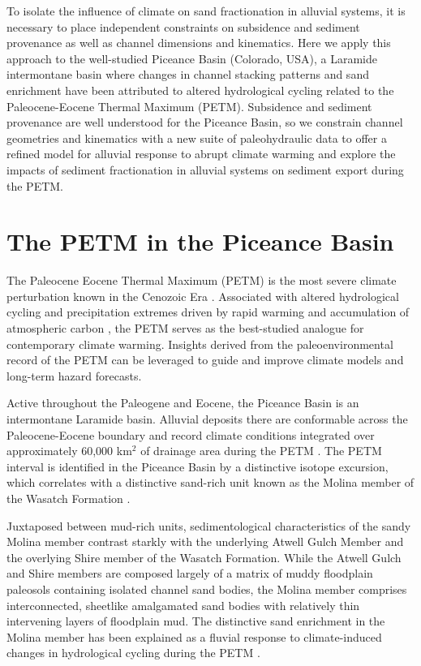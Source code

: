 \documentclass[draft]{compact_proposal}\usepackage[]{graphicx}\usepackage[]{color}
\newcommand{\del}[3]{\ce{\delta^#1#2_{#3}}}
\begin{document}
To isolate the influence of climate on sand fractionation in alluvial systems, it is necessary to place independent constraints on subsidence and sediment provenance as well as channel dimensions and kinematics.
Here we apply this approach to the well-studied Piceance Basin (Colorado, USA), a Laramide intermontane basin where changes in channel stacking patterns and sand enrichment have been attributed to altered hydrological cycling related to the Paleocene-Eocene Thermal Maximum (PETM).
Subsidence and sediment provenance are well understood for the Piceance Basin, so we constrain channel geometries and kinematics with a new suite of paleohydraulic data to offer a refined model for alluvial response to abrupt climate warming and explore the impacts of sediment fractionation in alluvial systems on sediment export during the PETM.

\section{The PETM in the Piceance Basin}

The Paleocene Eocene Thermal Maximum (PETM) is the most severe climate perturbation known in the Cenozoic Era \parencite{zachos_early_2008, slotnick_large_2012}.
Associated with altered hydrological cycling and precipitation extremes driven by rapid warming and accumulation of atmospheric carbon \parencite{carmichael_hydrological_2017}, the PETM serves as the best-studied analogue for contemporary climate warming.
Insights derived from the paleoenvironmental record of the PETM can be leveraged to guide and improve climate models and long-term hazard forecasts.

Active throughout the Paleogene and Eocene, the Piceance Basin is an intermontane Laramide basin.
Alluvial deposits there are conformable across the Paleocene-Eocene boundary and record climate conditions integrated over approximately 60,000 km$^2$ of drainage area during the PETM \cnote[johnson].
The PETM interval is identified in the Piceance Basin by a distinctive \del{13}{C}{} isotope excursion, which correlates with a distinctive sand-rich unit known as the Molina member of the Wasatch Formation \parencite{foreman_fluvial_2012}.

Juxtaposed between mud-rich units, sedimentological characteristics of the sandy Molina member contrast starkly with the underlying Atwell Gulch Member and the overlying Shire member of the Wasatch Formation.
While the Atwell Gulch and Shire members are composed largely of a matrix of muddy floodplain paleosols containing isolated channel sand bodies, the Molina member comprises interconnected, sheetlike amalgamated sand bodies with relatively thin intervening layers of floodplain mud.
The distinctive sand enrichment in the Molina member has been explained as a fluvial response to climate-induced changes in hydrological cycling during the PETM \parencite{foreman_fluvial_2012}.
\end{document}
